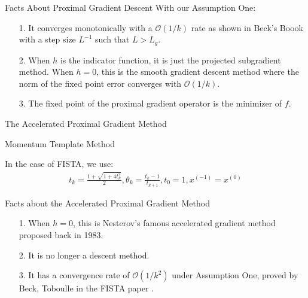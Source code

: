 \documentclass[11pt]{beamer}
\begin{document}
    \begin{frame}{Facts About Proximal Gradient Descent}
        With our Assumption One: 
        \begin{itemize}
            \item [1.] It converges monotonically with a $\mathcal O(1/k)$ rate as shown in Beck's Boook\cite{book:first_order_opt} with a step size $L^{-1}$ such that $L > L_g$. 
            \item [2.] When $h$ is the indicator function, it is just the projected subgradient method. When $h = 0$, this is the smooth gradient descent method where the norm of the fixed point error converges with $\mathcal O(1/k)$\cite{book:first_order_opt}. 
            \item [3.] The fixed point of the proximal gradient operator is the minimizer of $f$. 
        \end{itemize}
    \end{frame}
    \begin{frame}{The Accelerated Proximal Gradient Method}
        \begin{block}{Momentum Template Method}
            {\scriptsize
            \begin{algorithm}[H]
                \begin{algorithmic}[1]
                    \ENDFOR
                \end{algorithmic}
                \caption{Template Proximal Gradient Method With Momentum}\label{alg:fista_template}
            \end{algorithm}
            }
        \end{block}
        In the case of FISTA, we use: 
        \begin{align*}
            t_k = \frac{1 + \sqrt{1 + 4t_k^2}}{2}, \theta_k = \frac{t_k - 1}{t_{k + 1}}, t_0 = 1, x^{(-1)} = x^{(0)}
        \end{align*}
    \end{frame}
    \begin{frame}{Facts about the Accelerated Proximal Gradient Method}
        \begin{itemize}
            \item [1.] When $h = 0$, this is Nesterov's famous accelerated gradient method proposed back in 1983. 
            \item [2.] It is no longer a descent method. 
            \item [3.] It has a convergence rate of $\mathcal O(1/k^2)$ under Assumption One, proved by Beck, Toboulle in the FISTA paper \cite{paper:FISTA}. 
        \end{itemize}
    \end{frame}
    
\end{document}

